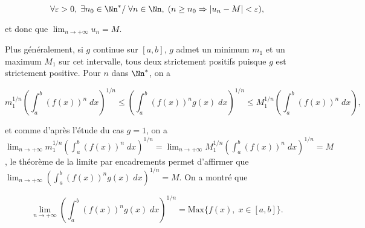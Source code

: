 {{$$\forall\varepsilon>0,\;\exists n_0\in\Nn^*/\;\forall n\in\Nn,\;(n\geq n_0\Rightarrow|u_n-M|<\varepsilon),$$

et donc que $\lim_{n\rightarrow +\infty}u_n=M$.

Plus généralement, si $g$ continue sur $[a,b]$, $g$ admet un minimum $m_1$ et un maximum $M_1$ sur cet intervalle, tous deux strictement positifs puisque $g$ est strictement positive. Pour $n$ dans $\Nn^*$, on a
 
$$m_1^{1/n}\left(\int_{a}^{b}(f(x))^n\;dx\right)^{1/n}\leq\left(\int_{a}^{b}(f(x))^ng(x)\;dx\right)^{1/n}\leq M_1^{1/n}\left(\int_{a}^{b}(f(x))^n\;dx\right),$$

et comme d'après l'étude du cas $g=1$, on a $\lim_{n\rightarrow +\infty}m_1^{1/n}\left(\int_{a}^{b}(f(x))^n\;dx\right)^{1/n}=\lim_{n\rightarrow +\infty}M_1^{1/n}\left(\int_{a}^{b}(f(x))^n\;dx\right)^{1/n}=M$, le théorème de la limite par encadrements permet d'affirmer que $\lim_{n\rightarrow +\infty}\left(\int_{a}^{b}(f(x))^ng(x)\;dx\right)^{1/n}=M$. On a montré que 

$$\lim_{n\rightarrow +\infty}\left(\int_{a}^{b}(f(x))^ng(x)\;dx\right)^{1/n}=\mbox{Max}\{f(x),\;x\in[a,b]\}.$$
}
}
